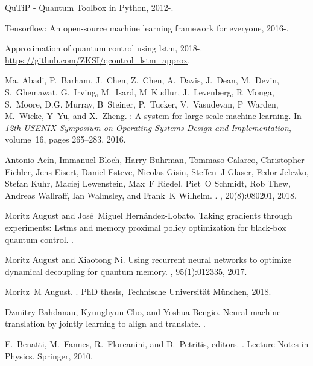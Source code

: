 \documentclass[aps,pra,showkeys,showpacs,notitlepage,superscriptaddress]{revtex4-1}
\newcommand{\1}{{\rm 1\hspace{-0.9mm}l}}
\begin{document}
\begin{thebibliography}{10}
  
  {QuTiP} - {Quantum} {Toolbox} in {Python}, 2012-.
  
  Tensorflow: An open-source machine learning framework for everyone, 2016-.
  
  Approximation of quantum control using lstm, 2018-.
  \newblock \url{https://github.com/ZKSI/qcontrol_lstm_approx}.
  
  Ma. Abadi, P.~Barham, J.~Chen, Z.~Chen, A.~Davis, J.~Dean, M.~Devin,
  S.~Ghemawat, G.~Irving, M.~Isard, M~Kudlur, J.~Levenberg, R~Monga, S.~Moore,
  D.G. Murray, B~Steiner, P.~Tucker, V.~Vasudevan, P~Warden, M.~Wicke, Y~Yu,
  and X.~Zheng.
  : A system for large-scale machine learning.
  \newblock In {\em 12th USENIX Symposium on Operating Systems Design and
    Implementation}, volume~16, pages 265--283, 2016.
  
  Antonio Ac{\'{i}}n, Immanuel Bloch, Harry Buhrman, Tommaso Calarco, Christopher
  Eichler, Jens Eisert, Daniel Esteve, Nicolas Gisin, Steffen~J Glaser, Fedor
  Jelezko, Stefan Kuhr, Maciej Lewenstein, Max~F Riedel, Piet~O Schmidt, Rob
  Thew, Andreas Wallraff, Ian Walmsley, and Frank~K Wilhelm.
  .
  , 20(8):080201, 2018.
  
  Moritz August and Jos{\'e}~Miguel Hern{\'a}ndez-Lobato.
  \newblock Taking gradients through experiments: Lstms and memory proximal
  policy optimization for black-box quantum control.
  .
  
  Moritz August and Xiaotong Ni.
  \newblock Using recurrent neural networks to optimize dynamical decoupling for
  quantum memory.
  , 95(1):012335, 2017.
  
  Moritz~M August.
  .
  \newblock PhD thesis, Technische Universit{\"a}t M{\"u}nchen, 2018.
  
  Dzmitry Bahdanau, Kyunghyun Cho, and Yoshua Bengio.
  \newblock Neural machine translation by jointly learning to align and
  translate.
  .
  
  F.~Benatti, M.~Fannes, R.~Floreanini, and D.~Petritis, editors.
  .
  \newblock Lecture Notes in Physics. Springer, 2010.
  

\end{thebibliography}
\end{document}
